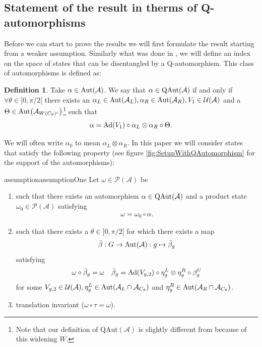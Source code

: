 \documentclass[12pt,a4paper,twoside]{article}
\let\originalleft\left
\let\originalright\right
\renewcommand{\left}{\mathopen{}\mathclose\bgroup\originalleft}
\renewcommand{\right}{\aftergroup\egroup\originalright}
\newcommand{\UU}{\mathcal U}
\newcommand{\PP}{\mathcal P}
\renewcommand{\AA}{\mathcal A}
\newcommand{\Ad}[1]{\textrm{Ad}\left(#1\right)}
\newcommand{\Aut}[1]{\textrm{Aut}\left(#1\right)}
\newcommand{\QAut}[1]{\textrm{QAut}\left(#1\right)}
\theoremstyle{definition}
\newtheorem{definition}[theorem]{Definition}
\numberwithin{equation}{section}
\begin{document}
\subsection{Statement of the result in therms of Q-automorphisms}\label{sec:Results_2}

Before we can start to prove the results we will first formulate the result starting from a weaker assumption. Similarly what was done in \cite{ogata2021h3gmathbb}, we will define an index on the space of states that can be disentangled by a Q-automorphism. This class of automorphisms is defined as:
\begin{definition}
	Take $\alpha\in\Aut{\AA}$. We say that $\alpha\in\QAut{\AA}$ if and only if $\forall\theta\in]0,\pi/2[$ there exists an $\alpha_L\in\Aut{\AA_L},\alpha_R\in\Aut{\AA_R},V_1\in\UU(\AA)$ and a $\Theta\in\Aut{\AA_{W(C_\theta)^c}}$\footnote{Note that our definition of $\textrm{QAut}(\AA)$ is slightly different from \cite{ogata2021h3gmathbb} because of this widening $W$.} such that
	\begin{equation}
		\alpha=\Ad{V_1}\circ\alpha_L\otimes\alpha_R\circ\Theta.
	\end{equation}
\end{definition}
We will often write $\alpha_0$ to mean $\alpha_L\otimes\alpha_R$. In this paper we will consider states that satisfy the following property (see figure \ref{fig:SetupWithQAutomorphism} for the support of the automorphisms):
\begin{restatable}{assumption}{assumptionOne}\label{assumption}
	Let $\omega\in\PP(\AA)$ be
	\begin{enumerate}
		\item such that there exists an automorphism $\alpha\in\QAut{\AA}$ and a product state $\omega_0\in\PP(\AA)$ satisfying
		\begin{align}
			\omega=\omega_0\circ\alpha.
		\end{align}
		\item such that there exists a $\theta\in]0,\pi/2[$ for which there exists a map
		\begin{equation}
			\tilde\beta:G\rightarrow\Aut{\AA}:g\mapsto\tilde\beta_g
		\end{equation}
		satisfying
		\begin{align}
			\omega\circ\tilde\beta_g&=\omega&\tilde\beta_g=\Ad{V_{g,2}}\circ\eta^L_g\otimes\eta^R_g\circ\beta^U_g
		\end{align}
		for some $V_{g,2}\in\UU(\AA),\eta^L_g\in\Aut{\AA_L\cap\AA_{C_\theta}}$ and $\eta^R_g\in\Aut{\AA_R\cap\AA_{C_\theta}}$.
		\item translation invariant ($\omega\circ\tau=\omega$).
	\end{enumerate}
\end{restatable}
\end{document}
